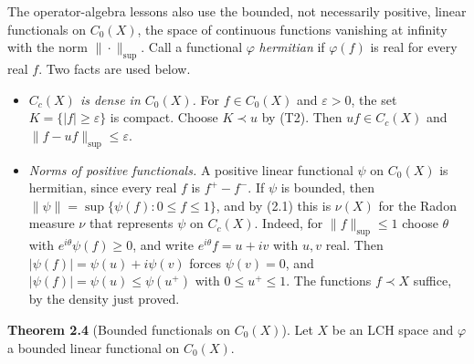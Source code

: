 \documentclass[
  english,
  11pt,
  a4paper,
]{article}
\providecommand{\tightlist}{%
  \setlength{\itemsep}{0pt}\setlength{\parskip}{0pt}}
\begin{document}
The operator-algebra lessons also use the bounded, not necessarily
positive, linear functionals on \(C_0(X)\), the space of continuous
functions vanishing at infinity with the norm \(\|\cdot\|_{\sup}\). Call
a functional \(\varphi\) \emph{hermitian} if \(\varphi(f)\) is real for
every real \(f\). Two facts are used below.

\begin{itemize}
\tightlist
\item
  \emph{\(C_c(X)\) is dense in \(C_0(X)\).} For \(f\in C_0(X)\) and
  \(\varepsilon>0\), the set \(K=\{|f|\geq\varepsilon\}\) is compact.
  Choose \(K\prec u\) by (T2). Then \(uf\in C_c(X)\) and
  \(\|f-uf\|_{\sup}\leq\varepsilon\).
\item
  \emph{Norms of positive functionals.} A positive linear functional
  \(\psi\) on \(C_0(X)\) is hermitian, since every real \(f\) is
  \(f^+-f^-\). If \(\psi\) is bounded, then
  \(\|\psi\|=\sup\{\psi(f):0\leq f\leq1\}\), and by (2.1) this is
  \(\nu(X)\) for the Radon measure \(\nu\) that represents \(\psi\) on
  \(C_c(X)\). Indeed, for \(\|f\|_{\sup}\leq1\) choose \(\theta\) with
  \(e^{i\theta}\psi(f)\geq0\), and write \(e^{i\theta}f=u+iv\) with
  \(u,v\) real. Then \(|\psi(f)|=\psi(u)+i\psi(v)\) forces
  \(\psi(v)=0\), and \(|\psi(f)|=\psi(u)\leq\psi(u^+)\) with
  \(0\leq u^+\leq1\). The functions \(f\prec X\) suffice, by the density
  just proved.
\end{itemize}

\textbf{Theorem 2.4} (Bounded functionals on \(C_0(X)\)). Let \(X\) be
an LCH space and \(\varphi\) a bounded linear functional on \(C_0(X)\).
\end{document}
